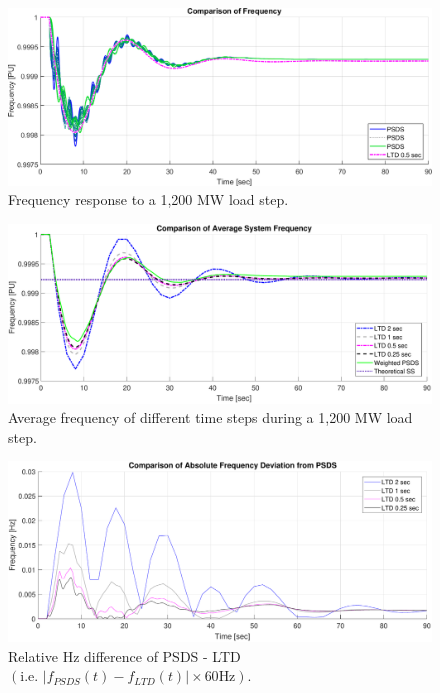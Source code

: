 \documentclass[12pt]{article}
\begin{document}
	\begin{figure}[h!]
			\centering
			\includegraphics[width=\figW\linewidth]{fComp}\vspace{-.5em}
			\caption{Frequency response to a 1,200 MW load step.}
			\label{systemf}		 
	\end{figure}\vspace{-2em}
	\begin{figure}[h!]
			\centering
			\includegraphics[width=\figW\linewidth]{tsWComp}\vspace{-.5em}
			\caption{Average frequency of different time steps during a 1,200 MW load step.}
			\label{tsComp}		 
	\end{figure}\vspace{-2em}

	\begin{figure}[h!]
			\centering
			\includegraphics[width=\figW\linewidth]{tsWCompRelF}\vspace{-.5em}
			\caption{Relative Hz difference of PSDS - LTD $\left( \text{i.e. }  \left|f_{PSDS}(t)- f_{LTD}(t)\right| \times 60 \text{Hz} \right)$.}
			\label{relF}		 
	\end{figure}\vspace{-.5em}
\end{document}
